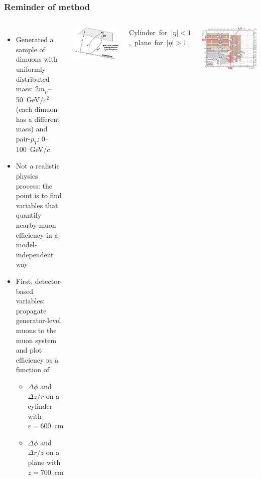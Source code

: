 \documentclass[compress]{beamer}
\begin{document}
\begin{frame}
\frametitle{Reminder of method}
\begin{columns}
\begin{itemize}
\item Generated a sample of dimuons with uniformly distributed mass:
  $2m_\mu$--50~GeV/$c^2$ (each dimuon has a different mass) and
  pair-$p_T$: 0--100~GeV/$c$

\item Not a realistic physics process: the point is to find variables
  that quantify nearby-muon efficiency in a model-independent way

\item First, detector-based variables: propagate generator-level muons
  to the muon system and plot efficiency as a function of
\begin{itemize}
\item $\Delta \phi$ and $\Delta z/r$ on a cylinder with $r=600$~cm
\item $\Delta \phi$ and $\Delta r/z$ on a plane with $z=700$~cm
\end{itemize}
\end{itemize}

\centering
\includegraphics[width=0.7\linewidth]{propagations.pdf}

\vspace{0.5 cm}
\mbox{Cylinder for $|\eta| < 1$, plane for $|\eta| > 1$\hspace{-0.15 cm}}

\includegraphics[width=\linewidth]{cms_quarterview.pdf}
\end{columns}
\end{frame}
\end{document}
